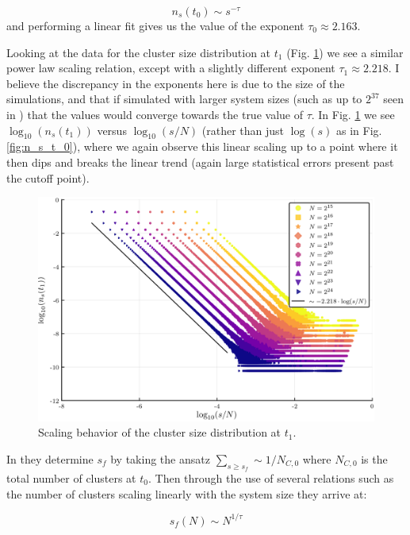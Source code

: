 \begin{equation}
	n_s(t_0) \sim s^{-\tau}
\end{equation}
and performing a linear fit gives us the value of the exponent $\tau_0 \approx 2.163$.

Looking at the data for the cluster size distribution at $t_1$ (Fig. \ref{fig:n_s_t_1}) we see a similar power law scaling relation, except with a slightly different exponent $\tau_1 \approx 2.218$.
I believe the discrepancy in the exponents here is due to the size of the simulations, and that if simulated with larger system sizes (such as up to $2^{37}$ seen in \cite{Lee_1}) that the values would converge towards the true value of $\tau$.
In Fig. \ref{fig:n_s_t_1} we see $\log_{10}(n_s(t_1))$ versus $\log_{10}(s/N)$ (rather than just $\log(s)$ as in Fig. \ref{fig:n_s_t_0}), where we again observe this linear scaling up to a point where it then dips and breaks the linear trend (again large statistical errors present past the cutoff point).

\begin{figure}[H]
	\centering
	\includegraphics[width=350pt, clip]{images/n_s_t_1.png}
	\caption{Scaling behavior of the cluster size distribution at $t_1$.}
	\label{fig:n_s_t_1}
\end{figure}

In \cite{Lee_1} they determine $s_f$ by taking the ansatz $\sum_{s \ge s_f} \sim 1 / N_{C, 0}$ where $N_{C, 0}$ is the total number of clusters at $t_0$.
Then through the use of several relations such as the number of clusters scaling linearly with the system size they arrive at:

\begin{equation}
	s_f(N) \sim N^{1 / \tau}
\end{equation}

